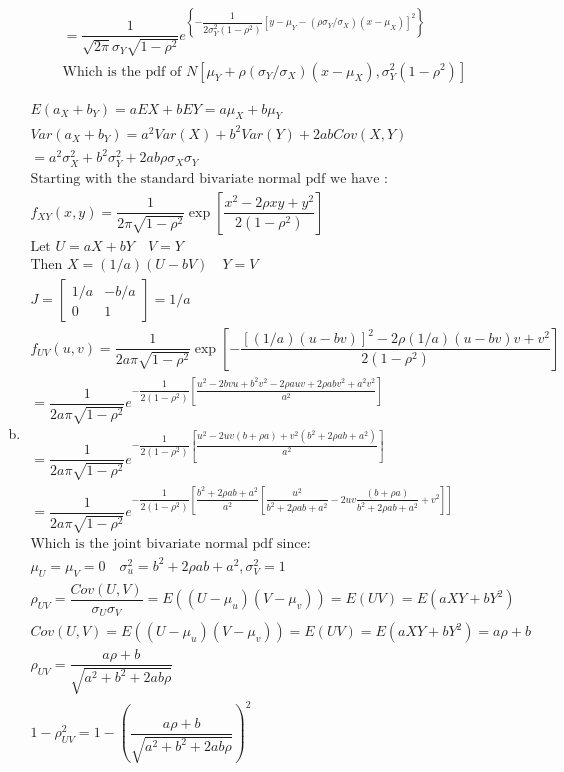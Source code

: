 \documentclass{article}
\begin{document}
\begin{flushleft}
\begin{enumerate}[(a)]
\begin{multline*}
=\dfrac{1}{\sqrt{2\pi}\sigma_Y \sqrt{1-\rho^2}}e^{\left\{-\dfrac{1}{2\sigma^2_Y(1-\rho^2)}\left[y-\mu_Y-(\rho\sigma_Y /\sigma_X)(x-\mu_X) \right]^2 \right\}}\\
\text{Which is the pdf of } N[\mu_Y+\rho(\sigma_Y/\sigma_X)(x-\mu_X),\sigma^2_Y(1-\rho^2)]
\end{multline*}
\item 
\begin{multline*}
E(a_X+b_Y)=aEX+bEY=a\mu_X+b\mu_Y\\
Var(a_X+b_Y)=a^2Var(X)+b^2Var(Y)+2abCov(X,Y)\\
=a^2\sigma_X^2+b^2\sigma^2_Y+2ab\rho\sigma_X\sigma_Y\\
\text{Starting with the standard bivariate normal pdf we have :}\\
f_{XY}(x,y)=\dfrac{1}{2\pi\sqrt{1-\rho^2}}\exp{\left[\dfrac{x^2-2\rho xy+y^2}{2(1-\rho^2)}\right]}\\
\text{Let } U=aX+bY \quad V=Y\\
\text{Then } X=(1/a)(U-bV) \quad Y=V\\
J=\begin{bmatrix}
1/a & -b/a \\
0 & 1
\end{bmatrix}=1/a\\
f_{UV}(u,v)=\dfrac{1}{2a\pi\sqrt{1-\rho^2}}\exp{\left[-\dfrac{[(1/a)(u-bv)]^2-2\rho (1/a)(u-bv)v+v^2}{2(1-\rho^2)}\right]}\\
=\dfrac{1}{2a\pi\sqrt{1-\rho^2}}e^{-\dfrac{1}{2(1-\rho^2)}\left[\dfrac{u^2-2bvu+b^2v^2-2\rho auv+2\rho abv^2+a^2v^2}{a^2}\right]}\\
=\dfrac{1}{2a\pi\sqrt{1-\rho^2}}e^{-\dfrac{1}{2(1-\rho^2)}\left[\dfrac{u^2-2uv(b+\rho a)+v^2(b^2+2\rho ab+a^2)}{a^2}\right]}\\
=\dfrac{1}{2a\pi\sqrt{1-\rho^2}}e^{-\dfrac{1}{2(1-\rho^2)}\left[\dfrac{b^2+2\rho ab+a^2}{a^2}\left[\dfrac{u^2}{b^2+2\rho ab+a^2}-2uv\dfrac{(b+\rho a)}{b^2+2\rho ab+a^2}+v^2\right] \right]}\\
\text{Which is the joint bivariate normal pdf since:}\\
\mu_U=\mu_V=0 \quad \sigma_u^2=b^2+2\rho ab+a^2, \sigma^2_V=1\\
\rho_{UV}=\dfrac{Cov(U,V)}{\sigma_U\sigma_V}=E((U-\mu_u)(V-\mu_v))=E(UV)=E(aXY+bY^2)\\
Cov(U,V)=E((U-\mu_u)(V-\mu_v))=E(UV)=E(aXY+bY^2)=a\rho+b\\
\rho_{UV}=\dfrac{a\rho+b}{\sqrt{a^2+b^2+2ab\rho}}\\
1-\rho_{UV}^2=1-\left(\dfrac{a\rho+b}{\sqrt{a^2+b^2+2ab\rho}}\right)^2\\

\end{multline*}
\end{enumerate}
\end{flushleft}
\end{document}
